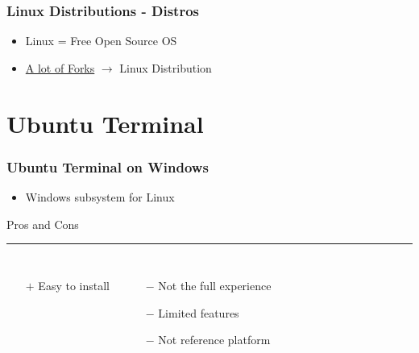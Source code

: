 \begin{frame}

	
\end{frame}

\begin{frame}
	\frametitle{Linux Distributions - Distros}

	\begin{itemize}
		\item Linux = Free Open Source OS
        \item \href{https://upload.wikimedia.org/wikipedia/commons/1/1b/Linux_Distribution_Timeline.svg}{A lot of Forks} $\rightarrow$ Linux Distribution
	\end{itemize}
	
	\vfill
	
	\centering 
	
\end{frame}

\section{Ubuntu Terminal}
\begin{frame}
	\frametitle{Ubuntu Terminal on Windows}
	
	\begin{itemize}
		\item Windows subsystem for Linux
	\end{itemize}
	\vspace{0.5cm}
	
	Pros and Cons \vspace{0.1cm}
	\hrule 
	\begin{columns}[t]
		\begin{enumerate}
			\item[$+$] Easy to install
		\end{enumerate}
		\begin{enumerate}
			\item[$-$] Not the full experience
			\item[$-$] Limited features
			\item[$-$] Not reference platform
		\end{enumerate}
	\end{columns} \vspace{0.5cm}
	
	\begin{itemize}
		\item[] 
		\item[] 
	\end{itemize}
	
\end{frame}

